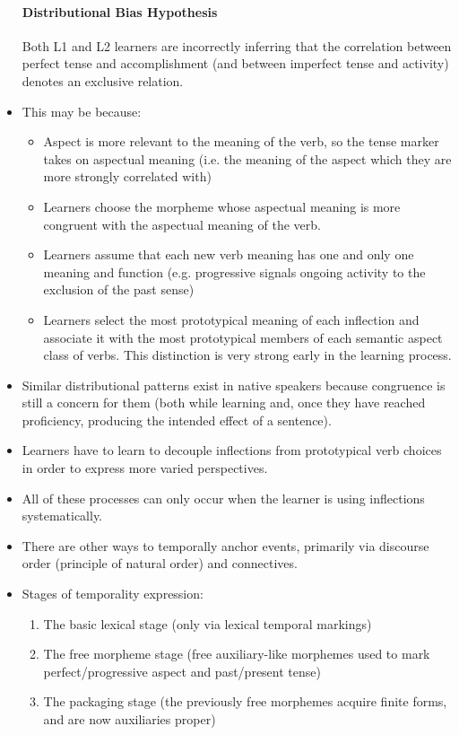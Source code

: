 \documentclass{article}
\begin{document}
\begin{itemize}
    \paragraph{Distributional Bias Hypothesis} Both L1 and L2 learners are incorrectly inferring that the correlation between perfect tense and accomplishment (and between imperfect tense and activity) denotes an exclusive relation.
    \item This may be because:
    \begin{itemize}
        \item Aspect is more relevant to the meaning of the verb, so the tense marker takes on aspectual meaning (i.e. the meaning of the aspect which they are more strongly correlated with)
        \item Learners choose the morpheme whose aspectual meaning is more congruent with the aspectual meaning of the verb.
        \item Learners assume that each new verb meaning has one and only one meaning and function (e.g. progressive signals ongoing activity to the exclusion of the past sense) 
        \item Learners select the most prototypical meaning of each inflection and associate it with the most prototypical members of each semantic aspect class of verbs. This distinction is very strong early in the learning process. 
    \end{itemize}
    \item Similar distributional patterns exist in native speakers because congruence is still a concern for them (both while learning and, once they have reached proficiency, producing the intended effect of a sentence).
    \item Learners have to learn to decouple inflections from prototypical verb choices in order to express more varied perspectives.
    \item All of these processes can only occur when the learner is using inflections systematically.
    \item There are other ways to temporally anchor events, primarily via discourse order (principle of natural order) and connectives.
    \item Stages of temporality expression:
    \begin{enumerate}
        \item The basic lexical stage (only via lexical temporal markings)
        \item The free morpheme stage (free auxiliary-like morphemes used to mark perfect/progressive aspect and past/present tense)
        \item The packaging stage (the previously free morphemes acquire finite forms, and are now auxiliaries proper)
    \end{enumerate}
\end{itemize}
\end{document}
